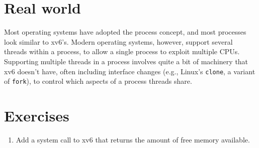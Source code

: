 \section{Real world}

Most operating systems have adopted the process concept, and most
processes look similar to xv6's.  Modern operating systems, however,
support several threads within a process, to allow a single process to
exploit multiple CPUs.  Supporting multiple threads in a
process involves quite a bit of machinery that xv6 doesn't have,
often including interface changes (e.g., Linux's
\lstinline{clone},
a variant of
\lstinline{fork}),
to control which aspects of
a process threads share.
\section{Exercises}

\begin{enumerate}

\item Add a system call to xv6
  that returns the amount of free memory available.


\end{enumerate}
